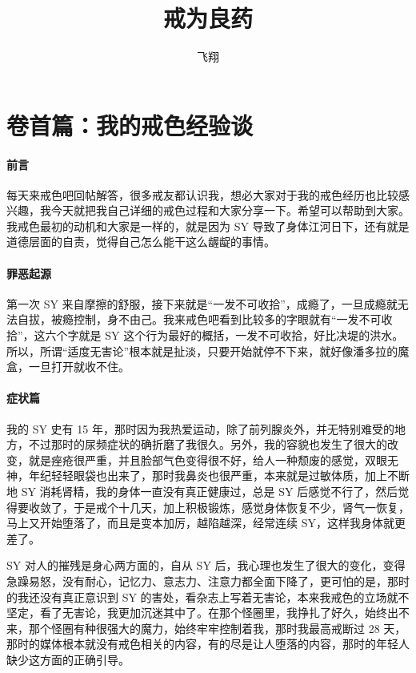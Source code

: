 \documentclass{ctexart}
\title{戒为良药}
\author{飞翔}
\date{}
\begin{document}
\maketitle
\begin{multicols}{2}
\end{multicols}\clearpage

\section{卷首篇：我的戒色经验谈}

\paragraph{前言}

每天来戒色吧回帖解答，很多戒友都认识我，想必大家对于我的戒色经历也比较感兴趣，我今天就把我自己详细的戒色过程和大家分享一下。希望可以帮助到大家。我戒色最初的动机和大家是一样的，就是因为 SY 导致了身体江河日下，还有就是道德层面的自责，觉得自己怎么能干这么龌龊的事情。

\paragraph{罪恶起源}

第一次 SY 来自摩擦的舒服，接下来就是“一发不可收拾”，成瘾了，一旦成瘾就无法自拔，被瘾控制，身不由己。我来戒色吧看到比较多的字眼就有“一发不可收拾”，这六个字就是 SY 这个行为最好的概括，一发不可收拾，好比决堤的洪水。所以，所谓“适度无害论”根本就是扯淡，只要开始就停不下来，就好像潘多拉的魔盒，一旦打开就收不住。

\paragraph{症状篇}

我的 SY 史有 15 年，那时因为我热爱运动，除了前列腺炎外，并无特别难受的地方，不过那时的尿频症状的确折磨了我很久。另外，我的容貌也发生了很大的改变，就是痤疮很严重，并且脸部气色变得很不好，给人一种颓废的感觉，双眼无神，年纪轻轻眼袋也出来了，那时我鼻炎也很严重，本来就是过敏体质，加上不断地 SY 消耗肾精，我的身体一直没有真正健康过，总是 SY 后感觉不行了，然后觉得要收敛了，于是戒个十几天，加上积极锻炼，感觉身体恢复不少，肾气一恢复，马上又开始堕落了，而且是变本加厉，越陷越深，经常连续 SY，这样我身体就更差了。

SY 对人的摧残是身心两方面的，自从 SY 后，我心理也发生了很大的变化，变得急躁易怒，没有耐心，记忆力、意志力、注意力都全面下降了，更可怕的是，那时的我还没有真正意识到 SY 的害处，看杂志上写着无害论，本来我戒色的立场就不坚定，看了无害论，我更加沉迷其中了。在那个怪圈里，我挣扎了好久，始终出不来，那个怪圈有种很强大的魔力，始终牢牢控制着我，那时我最高戒断过 28 天，那时的媒体根本就没有戒色相关的内容，有的尽是让人堕落的内容，那时的年轻人缺少这方面的正确引导。
\end{document}
